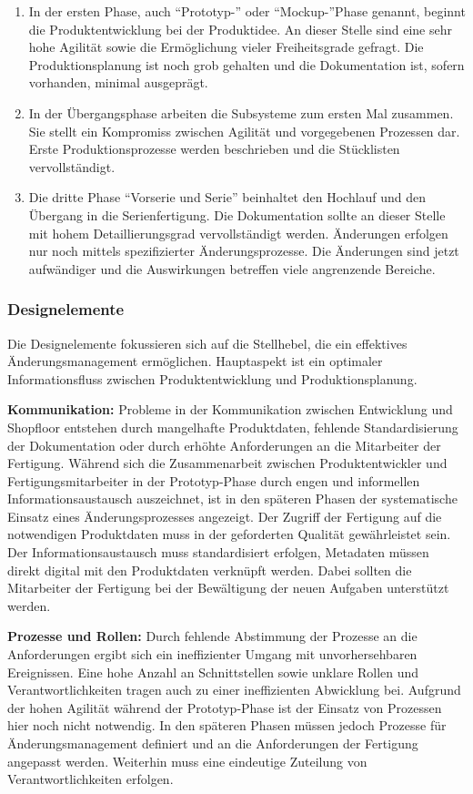 \begin{enumerate}
 \item In der ersten Phase, auch ``Prototyp-'' oder ``Mockup-''Phase genannt, beginnt die Produktentwicklung bei der Produktidee. An dieser Stelle sind eine sehr hohe Agilität sowie die Ermöglichung vieler Freiheitsgrade gefragt. Die Produktionsplanung ist noch grob gehalten und die Dokumentation ist, sofern vorhanden, minimal ausgeprägt. 
 \item In der Übergangsphase arbeiten die Subsysteme zum ersten Mal zusammen. Sie stellt ein Kompromiss zwischen Agilität und vorgegebenen Prozessen dar. Erste Produktionsprozesse werden beschrieben und die Stücklisten vervollständigt. 
 \item Die dritte Phase ``Vorserie und Serie'' beinhaltet den Hochlauf und den Übergang in die Serienfertigung. Die Dokumentation sollte an dieser Stelle mit hohem Detaillierungsgrad vervollständigt werden. Änderungen erfolgen nur noch mittels spezifizierter Änderungsprozesse. Die Änderungen sind jetzt aufwändiger und die Auswirkungen betreffen viele angrenzende Bereiche. 
\end{enumerate}

\subsubsection*{Designelemente}
Die Designelemente fokussieren sich auf die Stellhebel, die ein effektives Änderungsmanagement ermöglichen. Hauptaspekt ist ein optimaler Informationsfluss zwischen Produktentwicklung und Produktionsplanung. 

\textbf{Kommunikation: }
Probleme in der Kommunikation zwischen Entwicklung und Shopfloor entstehen durch mangelhafte Produktdaten, fehlende Standardisierung der Dokumentation oder durch erhöhte Anforderungen an die Mitarbeiter der Fertigung. 
Während sich die Zusammenarbeit zwischen Produktentwickler und Fertigungsmitarbeiter in der Prototyp-Phase durch engen und informellen Informationsaustausch auszeichnet, ist in den späteren Phasen der systematische Einsatz eines Änderungsprozesses angezeigt. Der Zugriff der Fertigung auf die notwendigen Produktdaten muss in der geforderten Qualität gewährleistet sein. Der Informationsaustausch muss standardisiert erfolgen, Metadaten müssen direkt digital mit den Produktdaten verknüpft werden. Dabei sollten die Mitarbeiter der Fertigung bei der Bewältigung der neuen Aufgaben unterstützt werden. 

\textbf{Prozesse und Rollen: }
Durch fehlende Abstimmung der Prozesse an die Anforderungen ergibt sich ein ineffizienter Umgang mit unvorhersehbaren Ereignissen. Eine hohe Anzahl an Schnittstellen sowie unklare Rollen und Verantwortlichkeiten tragen auch zu einer ineffizienten Abwicklung bei. 
Aufgrund der hohen Agilität während der Prototyp-Phase ist der Einsatz von Prozessen hier noch nicht notwendig. In den späteren Phasen müssen jedoch Prozesse für Änderungsmanagement definiert und an die Anforderungen der Fertigung angepasst werden. 
Weiterhin muss eine eindeutige Zuteilung von Verantwortlichkeiten erfolgen. 

